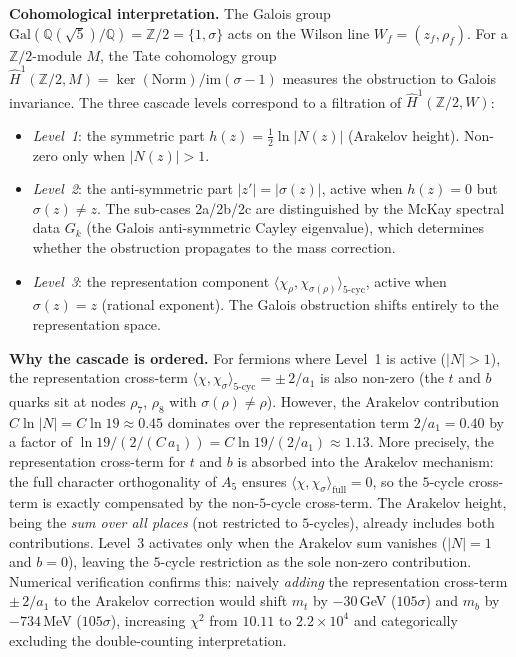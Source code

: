 \documentclass[12pt,a4paper]{article}
\theoremstyle{definition}
\begin{document}
\textbf{Cohomological interpretation.}  The Galois group $\mathrm{Gal}(\mathbb{Q}(\sqrt{5})/\mathbb{Q}) = \mathbb{Z}/2 = \{1, \sigma\}$ acts on the Wilson line $W_f = (z_f, \rho_f)$.  For a $\mathbb{Z}/2$-module $M$, the Tate cohomology group $\hat{H}^1(\mathbb{Z}/2, M) = \ker(\mathrm{Norm}) / \mathrm{im}(\sigma - 1)$ measures the obstruction to Galois invariance.  The three cascade levels correspond to a filtration of $\hat{H}^1(\mathbb{Z}/2, W)$:
\begin{itemize}
\item \emph{Level~1}: the symmetric part $h(z) = \tfrac{1}{2}\ln|N(z)|$ (Arakelov height).  Non-zero only when $|N(z)| > 1$.
\item \emph{Level~2}: the anti-symmetric part $|z'| = |\sigma(z)|$, active when $h(z) = 0$ but $\sigma(z) \neq z$.  The sub-cases 2a/2b/2c are distinguished by the McKay spectral data $G_k$ (the Galois anti-symmetric Cayley eigenvalue), which determines whether the obstruction propagates to the mass correction.
\item \emph{Level~3}: the representation component $\langle\chi_\rho, \chi_{\sigma(\rho)}\rangle_{\text{5-cyc}}$, active when $\sigma(z) = z$ (rational exponent).  The Galois obstruction shifts entirely to the representation space.
\end{itemize}

\textbf{Why the cascade is ordered.}  For fermions where Level~1 is active ($|N| > 1$), the representation cross-term $\langle\chi, \chi_\sigma\rangle_{\text{5-cyc}} = \pm\, 2/a_1$ is also non-zero (the $t$ and $b$ quarks sit at nodes $\rho_7$, $\rho_8$ with $\sigma(\rho) \neq \rho$).  However, the Arakelov contribution $C\ln|N| = C\ln 19 \approx 0.45$ dominates over the representation term $2/a_1 = 0.40$ by a factor of $\ln 19 / (2/(C\,a_1)) = C\ln 19 / (2/a_1) \approx 1.13$.  More precisely, the representation cross-term for $t$ and $b$ is absorbed into the Arakelov mechanism: the full character orthogonality of $A_5$ ensures $\langle\chi, \chi_\sigma\rangle_{\mathrm{full}} = 0$, so the $5$-cycle cross-term is exactly compensated by the non-$5$-cycle cross-term.  The Arakelov height, being the \emph{sum over all places} (not restricted to $5$-cycles), already includes both contributions.  Level~3 activates only when the Arakelov sum vanishes ($|N| = 1$ and $b = 0$), leaving the $5$-cycle restriction as the sole non-zero contribution.  Numerical verification confirms this: naively \emph{adding} the representation cross-term $\pm\, 2/a_1$ to the Arakelov correction would shift $m_t$ by $-30$\,GeV ($105\sigma$) and $m_b$ by $-734$\,MeV ($105\sigma$), increasing $\chi^2$ from $10.11$ to $2.2 \times 10^4$ and categorically excluding the double-counting interpretation.
\end{document}
